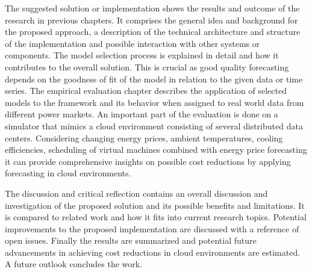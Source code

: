 The suggested solution or implementation shows the results and outcome of the research in previous chapters. It comprises the general idea and background for the proposed approach, a description of the technical architecture and structure of the implementation and possible interaction with other systems or components. The model selection process is explained in detail and how it contributes to the overall solution. This is crucial as good quality forecasting depends on the goodness of fit of the model in relation to the given data or time series. The empirical evaluation chapter describes the application of selected models to the framework and its behavior when assigned to real world data from different power markets. 
An important part of the evaluation is done on a simulator that mimics a cloud environment consisting of several distributed data centers. Considering changing energy prices, ambient temperatures, cooling efficiencies, scheduling of virtual machines combined with energy price forecasting it can provide comprehensive insights on possible cost reductions by applying forecasting in cloud environments. 

The discussion and critical reflection contains an overall discussion and investigation of the proposed solution and its possible benefits and limitations. It is compared to related work and how it fits into current research topics. Potential improvements to the proposed implementation are discussed with a reference of open issues. 
Finally the results are summarized and potential future advancements in achieving cost reductions in cloud environments are estimated. A future outlook concludes the work. 


